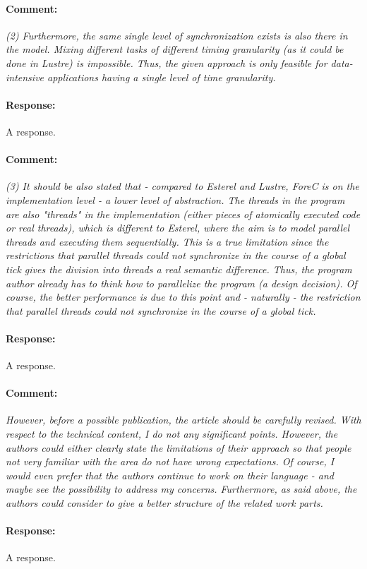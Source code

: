 \documentclass[a4paper,11pt]{article}
\newenvironment{comment}{\paragraph{Comment:}\em}{}
\newenvironment{response}{\paragraph{Response:}}{}
\begin{document}
\begin{comment}
	(2) Furthermore, the same single level of synchronization
	exists is also there in the model. Mixing different tasks of
	different timing granularity (as it could be done in Lustre)
	is impossible. Thus, the given approach is only feasible for
	data-intensive applications having a single level of time
	granularity.
\end{comment}
\begin{response}
	A response.
\end{response}

\begin{comment}
	(3) It should be also stated that - compared to Esterel and
	Lustre, ForeC is on the implementation level - a lower level
	of abstraction. The threads in the program are also
	"threads" in the implementation (either pieces of atomically
	executed code or real threads), which is different to
	Esterel, where the aim is to model parallel threads and
	executing them sequentially. This is a true limitation since
	the restrictions that parallel threads could not synchronize
	in the course of a global tick gives the division into
	threads a real semantic difference. Thus, the program author
	already has to think how to parallelize the program (a design
	decision). Of course, the better performance is due to this
	point and - naturally - the restriction that parallel
	threads could not synchronize in the course of a global
	tick.
\end{comment}
\begin{response}
	A response.
\end{response}

\begin{comment}
	However, before a
	possible publication, the article should be carefully
	revised. With respect to the technical content, I do not any
	significant points. However, the authors could either clearly
	state the limitations of their approach so that people not
	very familiar with the area do not have wrong expectations.
	Of course, I would even prefer that the authors continue to
	work on their language - and maybe see the possibility to
	address my concerns. Furthermore, as said above, the
	authors could consider to give a better structure of the
	related work parts.
\end{comment}
\begin{response}
	A response.
\end{response}

\end{document}
